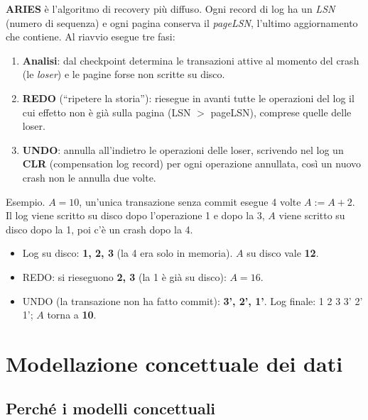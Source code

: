 \documentclass[a4paper,12pt]{article}
\begin{document}
\textbf{ARIES} è l'algoritmo di recovery più diffuso. Ogni record di log ha un
\emph{LSN} (numero di sequenza) e ogni pagina conserva il \emph{pageLSN},
l'ultimo aggiornamento che contiene. Al riavvio esegue tre fasi:
\begin{enumerate}
  \item \textbf{Analisi}: dal checkpoint determina le transazioni attive al
    momento del crash (le \emph{loser}) e le pagine forse non scritte su disco.
  \item \textbf{REDO} (``ripetere la storia''): riesegue in avanti tutte le
    operazioni del log il cui effetto non è già sulla pagina
    (LSN $>$ pageLSN), comprese quelle delle loser.
  \item \textbf{UNDO}: annulla all'indietro le operazioni delle loser,
    scrivendo nel log un \textbf{CLR} (compensation log record) per ogni
    operazione annullata, così un nuovo crash non le annulla due volte.
\end{enumerate}

Esempio. $A=10$, un'unica transazione senza commit esegue 4 volte
$A := A+2$. Il log viene scritto su disco dopo l'operazione 1 e dopo la 3,
$A$ viene scritto su disco dopo la 1, poi c'è un crash dopo la 4.
\begin{itemize}
  \item Log su disco: \textbf{1, 2, 3} (la 4 era solo in memoria). $A$ su disco
    vale \textbf{12}.
  \item REDO: si rieseguono \textbf{2, 3} (la 1 è già su disco): $A = 16$.
  \item UNDO (la transazione non ha fatto commit): \textbf{3', 2', 1'}. Log
    finale: 1 2 3 3' 2' 1'; $A$ torna a \textbf{10}.
\end{itemize}

\section{Modellazione concettuale dei dati}

\subsection{Perché i modelli concettuali}
\end{document}
